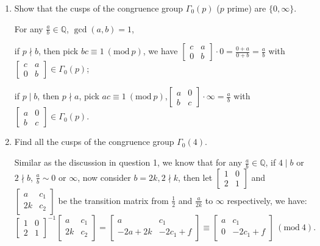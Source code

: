\begin{enumerate}
  
  \item Show that the cusps of the congruence group $\Gamma_0(p)$ ($p$ prime) are $\{0, \infty\}$.
\begin{proofc}[解答]
    For any $\frac{a}{b} \in \mathbb{Q}$, $\gcd(a, b) = 1$,
    
    if $p \nmid b$, then pick $bc \equiv 1 \ (\mathrm{mod} \ p)$, we have $\begin{bmatrix}
        c & a \\
        0 & b
    \end{bmatrix} \cdot 0 = \frac{0+a}{0+b} = \frac{a}{b}$ with $\begin{bmatrix}
        c & a \\
        0 & b
    \end{bmatrix} \in \Gamma_0(p)$;


    if $p \mid b$, then $p \nmid a$, pick $ac \equiv 1 \ (\mathrm{mod} \ p)$,$\begin{bmatrix}
        a & 0 \\
        b & c
    \end{bmatrix} \cdot \infty = \frac{a}{b}$ with $\begin{bmatrix}
        a & 0 \\
        b & c
    \end{bmatrix} \in \Gamma_0(p)$.
\end{proofc}

\item Find all the cusps of the congruence group $\Gamma_0(4)$.
\begin{proofc}[解答]

Similar as the discussion in question 1, we know that for any $\frac{a}{b} \in \mathbb{Q}$, 
if $4 \mid b$ or $2 \nmid b$, $\frac{a}{b} \sim 0$ or $\infty$, now consider $b = 2k, 2\nmid k$,
then let $\begin{bmatrix}
    1 & 0 \\
    2 & 1
\end{bmatrix}$ and $\begin{bmatrix}
    a & c_1\\
    2k & c_2
\end{bmatrix}$ be the transition matrix from $\frac12$ and $\frac{a}{2k}$ to $\infty$ respectively, 
we have:
$$\begin{bmatrix}
    1 & 0 \\
    2 & 1
\end{bmatrix} ^{-1} \begin{bmatrix}
    a & c_1\\
    2k & c_2
\end{bmatrix}
 = \begin{bmatrix}
    a & c_1\\
    -2a+2k & -2c_1+f
 \end{bmatrix} \equiv \begin{bmatrix}
    a & c_1 \\
    0 & -2c_1 + f
 \end{bmatrix} \ (\mathrm{mod} \ 4).$$


\end{proofc}
\end{enumerate}

